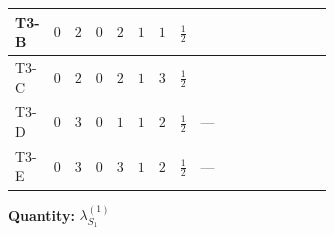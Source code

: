 \documentclass[8pt]{article}
\begin{document}
\begin{landscape}
\begin{longtable}{@{}llcccccc >{\raggedright\arraybackslash}p{0.21\linewidth} >{\raggedright\arraybackslash}p{0.21\linewidth} >{\raggedright\arraybackslash}p{0.21\linewidth}@{}}
\midrule
T3-B & $0$ & $2$ & $0$ & $2$ & $1$ & $1$ & $\frac{1}{2}$ & \scriptsize\adjustbox{max width=\linewidth}{$\begin{gathered} 4 {\lambda_{S_1}^{(1)}} T_{\nu}^{(1)}\end{gathered}$} & \scriptsize\adjustbox{max width=\linewidth}{$\begin{gathered} -4 \operatorname{Tr}\!\left({y_1}\,\left({y_1}\right)^{\dagger}\,{y_1}\,\left({y_1}\right)^{\dagger}\right)\end{gathered}$} & \scriptsize\adjustbox{max width=\linewidth}{$\begin{gathered} +4 {\lambda_{12}^{(1)}}^2\end{gathered}$} \\
\midrule
T3-C & $0$ & $2$ & $0$ & $2$ & $1$ & $3$ & $\frac{1}{2}$ & \scriptsize\adjustbox{max width=\linewidth}{$\begin{gathered} 6 {\lambda_{S_1}^{(1)}} T_{\nu}^{(1)}\end{gathered}$} & \scriptsize\adjustbox{max width=\linewidth}{$\begin{gathered} -5 \operatorname{Tr}\!\left({y_1}\,\left({y_1}\right)^{\dagger}\,{y_1}\,\left({y_1}\right)^{\dagger}\right)\end{gathered}$} & \scriptsize\adjustbox{max width=\linewidth}{$\begin{gathered} +4 {\lambda_{12}^{(1)}}^2\end{gathered}$} \\
\midrule
T3-D & $0$ & $3$ & $0$ & $1$ & $1$ & $2$ & $\frac{1}{2}$ & --- & \scriptsize\adjustbox{max width=\linewidth}{$\begin{gathered} -3 \operatorname{Tr}\!\left({y_1}\,\left({y_1}\right)^{\dagger}\,{y_1}\,\left({y_1}\right)^{\dagger}\right)\end{gathered}$} & \scriptsize\adjustbox{max width=\linewidth}{$\begin{gathered} +2 {\lambda_{12}^{(1)}}^2\end{gathered}$} \\
\midrule
T3-E & $0$ & $3$ & $0$ & $3$ & $1$ & $2$ & $\frac{1}{2}$ & --- & \scriptsize\adjustbox{max width=\linewidth}{$\begin{gathered} -3 \operatorname{Tr}\!\left({y_1}\,\left({y_1}\right)^{\dagger}\,{y_1}\,\left({y_1}\right)^{\dagger}\right)\end{gathered}$} & \scriptsize\adjustbox{max width=\linewidth}{$\begin{gathered} +6 {\lambda_{12}^{(1)}}^2\end{gathered}$} \\
\midrule
\bottomrule
\end{longtable}
\clearpage
\noindent\textbf{Quantity: }$\lambda_{S_1}^{(1)}$\par\smallskip

\end{landscape}
\end{document}
